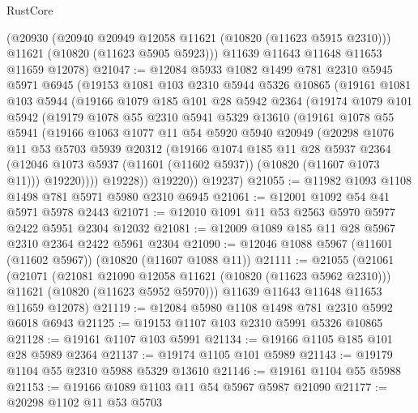 \begin{lexlean}{RustCore}
\begin{coremodule}
      (@20930
        (@20940 @20949 @12058 @11621 (@10820 (@11623 @5915 @2310)))
        @11621
        (@10820 (@11623 @5905 @5923)))
      @11639
      @11643
      @11648
      @11653
      @11659
      @12078)
@21047 := @12084
    @5933
    @1082
    @1499
    @781
    @2310
    @5945
    @5971
    @6945
    (@19153
      @1081
      @103
      @2310
      @5944
      @5326
      @10865
      (@19161
        @1081
        @103
        @5944
        (@19166
          @1079
          @185
          @101
          @28
          @5942
          @2364
          (@19174
            @1079
            @101
            @5942
            (@19179
              @1078
              @55
              @2310
              @5941
              @5329
              @13610
              (@19161
                @1078
                @55
                @5941
                (@19166
                  @1063
                  @1077
                  @11
                  @54
                  @5920
                  @5940
                  @20949
                  (@20298
                    @1076
                    @11
                    @53
                    @5703
                    @5939
                    @20312
                    (@19166
                      @1074
                      @185
                      @11
                      @28
                      @5937
                      @2364
                      (@12046 @1073 @5937 (@11601 (@11602 @5937)) (@10820 (@11607 @1073 @11)))
                      @19220))))
              @19228))
          @19220))
      @19237)
@21055 := @11982 @1093 @1108 @1498 @781 @5971 @5980 @2310 @6945
@21061 := @12001 @1092 @54 @41 @5971 @5978 @2443
@21071 := @12010 @1091 @11 @53 @2563 @5970 @5977 @2422 @5951 @2304 @12032
@21081 := @12009 @1089 @185 @11 @28 @5967 @2310 @2364 @2422 @5961 @2304
@21090 := @12046 @1088 @5967 (@11601 (@11602 @5967)) (@10820 (@11607 @1088 @11))
@21111 := @21055
    (@21061
      (@21071
        (@21081 @21090 @12058 @11621 (@10820 (@11623 @5962 @2310)))
        @11621
        (@10820 (@11623 @5952 @5970)))
      @11639
      @11643
      @11648
      @11653
      @11659
      @12078)
@21119 := @12084 @5980 @1108 @1498 @781 @2310 @5992 @6018 @6943
@21125 := @19153 @1107 @103 @2310 @5991 @5326 @10865
@21128 := @19161 @1107 @103 @5991
@21134 := @19166 @1105 @185 @101 @28 @5989 @2364
@21137 := @19174 @1105 @101 @5989
@21143 := @19179 @1104 @55 @2310 @5988 @5329 @13610
@21146 := @19161 @1104 @55 @5988
@21153 := @19166 @1089 @1103 @11 @54 @5967 @5987 @21090
@21177 := @20298
    @1102
    @11
    @53
    @5703

\end{coremodule}
\end{lexlean}
